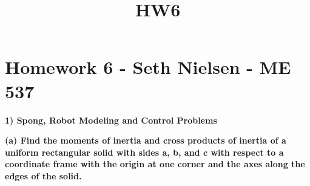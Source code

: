 \documentclass[11pt]{article}
\title{HW6}
\begin{document}
    
    
    \maketitle
    
    

    
    \section{Homework 6 - Seth Nielsen - ME
537}\label{homework-6---seth-nielsen---me-537}

    \textbf{1) Spong, Robot Modeling and Control Problems}

\textbf{(a) Find the moments of inertia and cross products of inertia of
a uniform rectangular solid with sides a, b, and c with respect to a
coordinate frame with the origin at one corner and the axes along the
edges of the solid.}
\end{document}
